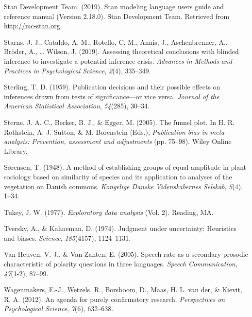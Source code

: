 \documentclass[
  english,
  man,floatsintext]{apa6}
\begin{document}
\leavevmode\hypertarget{ref-stan}{}%
Stan Development Team. (2019). Stan modeling language users guide and reference manual (Version 2.18.0). Stan Development Team. Retrieved from \url{http://mc-stan.org}

\leavevmode\hypertarget{ref-starns2019assessing}{}%
Starns, J. J., Cataldo, A. M., Rotello, C. M., Annis, J., Aschenbrenner, A., Bröder, A., \ldots{} Wilson, J. (2019). Assessing theoretical conclusions with blinded inference to investigate a potential inference crisis. \emph{Advances in Methods and Practices in Psychological Science}, \emph{2}(4), 335--349.

\leavevmode\hypertarget{ref-sterling1959publication}{}%
Sterling, T. D. (1959). Publication decisions and their possible effects on inferences drawn from tests of significance---or vice versa. \emph{Journal of the American Statistical Association}, \emph{54}(285), 30--34.

\leavevmode\hypertarget{ref-sterne2005}{}%
Sterne, J. A. C., Becker, B. J., \& Egger, M. (2005). The funnel plot. In H. R. Rothstein, A. J. Sutton, \& M. Borenstein (Eds.), \emph{Publication bias in meta-analysis: Prevention, assessment and adjustments} (pp. 75--98). Wiley Online Library.

\leavevmode\hypertarget{ref-sorensen1948}{}%
Sørensen, T. (1948). A method of establishing groups of equal amplitude in plant sociology based on similarity of species and its application to analyses of the vegetation on Danish commons. \emph{Kongelige Danske Videnskabernes Selskab}, \emph{5}(4), 1--34.

\leavevmode\hypertarget{ref-tukey1977exploratory}{}%
Tukey, J. W. (1977). \emph{Exploratory data analysis} (Vol. 2). Reading, MA.

\leavevmode\hypertarget{ref-tversky1974judgment}{}%
Tversky, A., \& Kahneman, D. (1974). Judgment under uncertainty: Heuristics and biases. \emph{Science}, \emph{185}(4157), 1124--1131.

\leavevmode\hypertarget{ref-van2005speech}{}%
Van Heuven, V. J., \& Van Zanten, E. (2005). Speech rate as a secondary prosodic characteristic of polarity questions in three languages. \emph{Speech Communication}, \emph{47}(1-2), 87--99.

\leavevmode\hypertarget{ref-wagenmakers2012agenda}{}%
Wagenmakers, E.-J., Wetzels, R., Borsboom, D., Maas, H. L. van der, \& Kievit, R. A. (2012). An agenda for purely confirmatory research. \emph{Perspectives on Psychological Science}, \emph{7}(6), 632--638.
\end{document}
